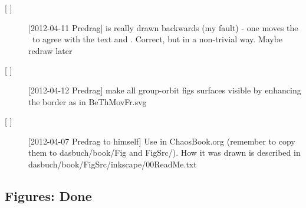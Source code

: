 \begin{description}
\item[{[ ]}]  [2012-04-11 Predrag]  is really
        drawn backwards (my fault) - one moves the \template\ to agree
        with the text and  . Correct, but in a
        non-trivial way. Maybe redraw later

\item[{[ ]}]  [2012-04-12 Predrag] make all group-orbit figs surfaces visible
              by enhancing the border as in BeThMovFr.svg
													
\item[{[ ]}] [2012-04-07 Predrag to himself]                               \toCB
Use  in ChaosBook.org (remember to copy them to
dasbuch/book/Fig and FigSrc/). How it was drawn is described in
dasbuch/book/FigSrc/inkscape/00ReadMe.txt

\end{description}

\subsection{Figures: Done}
\label{s:figsDone}

